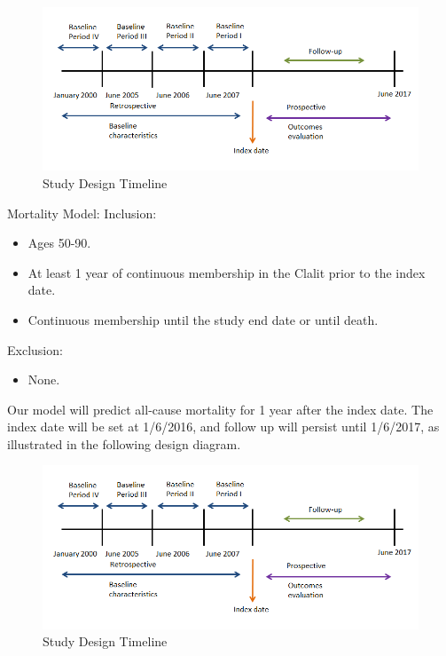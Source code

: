 \documentclass[a4paper,12pt]{article}
\begin{document}
		\begin{figure}[h]
			\centering
			\includegraphics[width=\textwidth]{prelim-results/Panpredictor/timeline1.png}
			\caption{Study Design Timeline}
		\end{figure}
	
		Mortality Model:
			Inclusion:
		\begin{itemize}
			\item Ages 50-90.
			\item At least 1 year of continuous membership in the Clalit prior to the index date.
			\item Continuous membership until the study end date or until death.
		\end{itemize}
		Exclusion:
		\begin{itemize}
			\item None.
		\end{itemize}
		
		Our model will predict all-cause mortality for 1 year after the index date. The index date will be set at 1/6/2016, and follow up will persist until 1/6/2017, as illustrated in the following design diagram.
		
		\begin{figure}[h]
			\centering
			\includegraphics[width=\textwidth]{prelim-results/Panpredictor/timeline1.png}
			\caption{Study Design Timeline}
		\end{figure}
		
\end{document}
